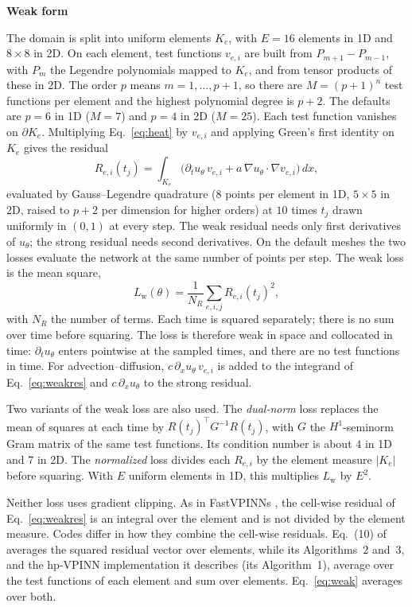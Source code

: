 \documentclass[a4paper,fleqn]{cas-sc}
\newcommand{\runhead}[1]{\par\medskip\noindent\textbf{#1}\par\nopagebreak\noindent\ignorespaces}
\begin{document}
\runhead{Weak form}
The domain is split into uniform elements $K_e$, with $E=16$ elements in 1D and $8\times8$ in 2D.
On each element, test functions $v_{e,i}$ are built from $P_{m+1}-P_{m-1}$, with $P_m$ the Legendre polynomials mapped
to $K_e$, and from tensor products of these in 2D. The order $p$ means $m=1,\dots,p+1$, so there are $M=(p+1)^n$ test functions per element and the highest
polynomial degree is $p+2$. The defaults are $p=6$ in 1D ($M=7$) and $p=4$ in 2D ($M=25$). Each test function vanishes
on $\partial K_e$.
Multiplying Eq.~\eqref{eq:heat} by $v_{e,i}$ and applying Green's first identity on $K_e$ gives the residual
\begin{equation}
R_{e,i}(t_j) = \int_{K_e}\bigl(\partial_t u_\theta\, v_{e,i} + a\,\nabla u_\theta\cdot\nabla v_{e,i}\bigr)\,dx,
\label{eq:weakres}
\end{equation}
evaluated by Gauss--Legendre quadrature ($8$ points per element in 1D, $5\times5$ in 2D, raised to $p+2$ per
dimension for higher orders) at $10$ times $t_j$ drawn uniformly in $(0,1)$ at every step. The weak residual needs only
first derivatives of $u_\theta$; the strong residual needs second derivatives. On the default meshes the two losses
evaluate the network at the same number of points per step. The weak loss is the mean square,
\begin{equation}
L_{\mathrm{w}}(\theta) = \frac{1}{N_R}\sum_{e,i,j} R_{e,i}(t_j)^2,
\label{eq:weak}
\end{equation}
with $N_R$ the number of terms. Each time is squared separately; there is no sum over time before squaring. The loss is therefore weak in space
and collocated in time: $\partial_t u_\theta$ enters pointwise at the sampled times, and there are no test functions in time. For
advection--diffusion, $c\,\partial_x u_\theta\,v_{e,i}$ is added to the integrand of Eq.~\eqref{eq:weakres} and
$c\,\partial_x u_\theta$ to the strong residual.

Two variants of the weak loss are also used. The \emph{dual-norm} loss \cite{rojas2024rvpinn} replaces the mean of
squares at each time by $R(t_j)^{\top}G^{-1}R(t_j)$, with $G$ the $H^1$-seminorm Gram matrix of the same test
functions. Its condition number is about $4$ in 1D and $7$ in 2D. The \emph{normalized} loss divides each $R_{e,i}$ by
the element measure $|K_e|$ before squaring. With $E$ uniform elements in 1D, this multiplies $L_{\mathrm{w}}$ by $E^2$.

Neither loss uses gradient clipping. As in FastVPINNs \cite[Eq.~9]{fastvpinn2024}, the cell-wise residual of
Eq.~\eqref{eq:weakres} is an integral over the element and is not divided by the element measure. Codes differ in how
they combine the cell-wise residuals. Eq.~(10) of \cite{fastvpinn2024} averages the squared residual vector over elements,
while its Algorithms~2 and~3, and the hp-VPINN implementation it describes (its Algorithm~1), average over the test
functions of each element and sum over elements. Eq.~\eqref{eq:weak} averages over both.
\end{document}
